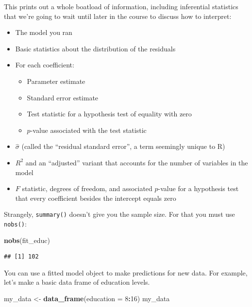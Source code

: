 \documentclass[
  12pt,
  oneside,openany]{book}
\newenvironment{Shaded}{\begin{snugshade}}{\end{snugshade}}
\newcommand{\DataTypeTok}[1]{\textcolor[rgb]{0.13,0.29,0.53}{#1}}
\newcommand{\DecValTok}[1]{\textcolor[rgb]{0.00,0.00,0.81}{#1}}
\newcommand{\KeywordTok}[1]{\textcolor[rgb]{0.13,0.29,0.53}{\textbf{#1}}}
\newcommand{\NormalTok}[1]{#1}
\newcommand{\OperatorTok}[1]{\textcolor[rgb]{0.81,0.36,0.00}{\textbf{#1}}}
\newcommand{\StringTok}[1]{\textcolor[rgb]{0.31,0.60,0.02}{#1}}
\providecommand{\tightlist}{%
  \setlength{\itemsep}{0pt}\setlength{\parskip}{0pt}}
\begin{document}
This prints out a whole boatload of information, including inferential statistics that we're going to wait until later in the course to discuss how to interpret:

\begin{itemize}
\tightlist
\item
  The model you ran
\item
  Basic statistics about the distribution of the residuals
\item
  For each coefficient:

  \begin{itemize}
  \tightlist
  \item
    Parameter estimate
  \item
    Standard error estimate
  \item
    Test statistic for a hypothesis test of equality with zero
  \item
    \(p\)-value associated with the test statistic
  \end{itemize}
\item
  \(\hat{\sigma}\) (called the ``residual standard error'', a term seemingly unique to R)
\item
  \(R^2\) and an ``adjusted'' variant that accounts for the number of variables in the model
\item
  \(F\) statistic, degrees of freedom, and associated \(p\)-value for a hypothesis test that every coefficient besides the intercept equals zero
\end{itemize}

Strangely, \texttt{summary()} doesn't give you the sample size. For that you must use \texttt{nobs()}:

\begin{Shaded}
\begin{Highlighting}[]
\KeywordTok{nobs}\NormalTok{(fit\_educ)}
\end{Highlighting}
\end{Shaded}

\begin{verbatim}
## [1] 102
\end{verbatim}

You can use a fitted model object to make predictions for new data. For example, let's make a basic data frame of education levels.

\begin{Shaded}
\begin{Highlighting}[]
\NormalTok{my\_data <{-}}\StringTok{ }\KeywordTok{data\_frame}\NormalTok{(}\DataTypeTok{education =} \DecValTok{8}\OperatorTok{:}\DecValTok{16}\NormalTok{)}
\NormalTok{my\_data}
\end{Highlighting}
\end{Shaded}
\end{document}
